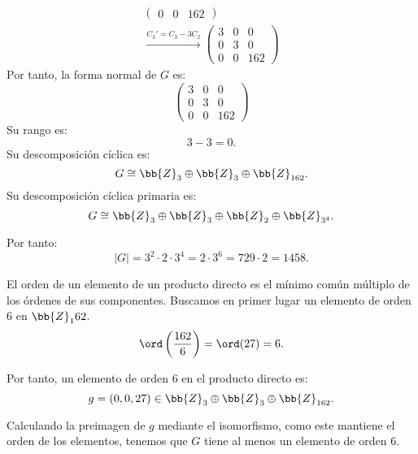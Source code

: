 \begin{ejercicio}
\begin{enumerate}
\begin{multline*}
\begin{pmatrix}
                0 & 0 & 162
            \end{pmatrix}\\
            \xrightarrow{C_3'=C_3-3C_2}
            \begin{pmatrix}
                3 & 0 & 0 \\
                0 & 3 & 0 \\
                0 & 0 & 162
            \end{pmatrix}
        \end{multline*}
        Por tanto, la forma normal de $G$ es:
        \begin{equation*}
            \begin{pmatrix}
                3 & 0 & 0 \\
                0 & 3 & 0 \\
                0 & 0 & 162
            \end{pmatrix}
        \end{equation*}
        Su rango es:
        \begin{equation*}
            3-3= 0.
        \end{equation*}
        Su descomposición cíclica es:
        \begin{equation*}
            G \cong \bb{Z}_3 \oplus \bb{Z}_3 \oplus \bb{Z}_{162}.
        \end{equation*}
        Su descomposición cíclica primaria es:
        \begin{equation*}
            G \cong \bb{Z}_3 \oplus \bb{Z}_3 \oplus \bb{Z}_2 \oplus \bb{Z}_{3^4}.
        \end{equation*}

        Por tanto:
        \begin{equation*}
            |G|= 3^2 \cdot 2\cdot 3^4 = 2 \cdot 3^6 = 729\cdot 2 = 1458.
        \end{equation*}

        El orden de un elemento de un producto directo es el mínimo común múltiplo de los órdenes de sus componentes. Buscamos en primer lugar un elemento de orden $6$ en $\bb{Z}_162$.
        \begin{equation*}
            \ord\left(\frac{162}{6}\right) = \ord(27) = 6.
        \end{equation*}

        Por tanto, un elemento de orden $6$ en el producto directo es:
        \begin{equation*}
            g = (0, 0, 27) \in \bb{Z}_3 \oplus \bb{Z}_3 \oplus \bb{Z}_{162}.
        \end{equation*}

        Calculando la preimagen de $g$ mediante el isomorfismo, como este mantiene el orden de los elementos, tenemos que $G$ tiene al menos un elemento de orden $6$.
    \end{enumerate}
\end{ejercicio}

